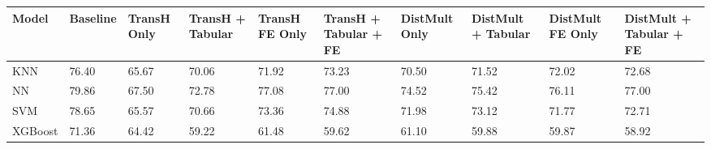 \begin{tabular}{llllllllll}
\toprule
Model & Baseline & TransH Only & TransH + Tabular & TransH FE Only & TransH + Tabular + FE & DistMult Only & DistMult + Tabular & DistMult FE Only & DistMult + Tabular + FE \\
\midrule
KNN & 76.40 & 65.67 & 70.06 & 71.92 & 73.23 & 70.50 & 71.52 & 72.02 & 72.68 \\
NN & 79.86 & 67.50 & 72.78 & 77.08 & 77.00 & 74.52 & 75.42 & 76.11 & 77.00 \\
SVM & 78.65 & 65.57 & 70.66 & 73.36 & 74.88 & 71.98 & 73.12 & 71.77 & 72.71 \\
XGBoost & 71.36 & 64.42 & 59.22 & 61.48 & 59.62 & 61.10 & 59.88 & 59.87 & 58.92 \\
\bottomrule
\end{tabular}
